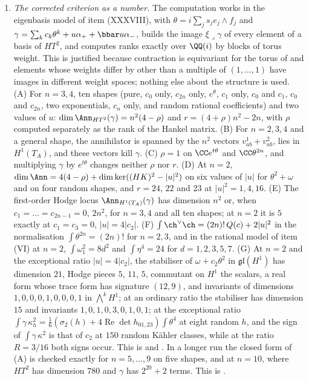\begin{enumerate}[label=\textup{(\Roman*)},leftmargin=*]
\item \emph{The corrected criterion as a number.} The computation works in
  the eigenbasis model of item (XXXVIII), with
  $\theta=i\sum_{j}s_{j}e_{j}\wedge f_{j}$ and
  $\gamma=\sum_{k}c_{k}\theta^{k}+u\alpha_{+}+\bbar u\alpha_{-}$, builds the
  image $\xi\lrcorner\gamma$ of every element of a basis of $HT^{2}$, and
  computes ranks exactly over $\QQ(i)$ by blocks of torus weight. This is
  justified because contraction is equivariant for the torus of
   and elements whose weights differ by other than a
  multiple of $(1,\dots,1)$ have images in different weight spaces; nothing
  else about the structure is used. (A) For $n=3,4$, ten shapes (pure, $c_{0}$
  only, $c_{2n}$ only, $e^{\theta}$, $c_{1}$ only, $c_{0}$ and $c_{1}$, $c_{0}$
  and $c_{2n}$, two exponentials, $c_{n}$ only, and random rational
  coefficients) and two values of $u$: $\dim\Ann_{HT^{2}}(\gamma)=n^{2}(4-\rho)$
  and $r=(4+\rho)n^{2}-2n$, with $\rho$ computed separately as the rank of the
  Hankel matrix. (B) For $n=2,3,4$ and a general shape, the annihilator is
  spanned by the $n^{2}$ vectors $v^{1}_{ab}+v^{2}_{ab}$, lies in $H^{1}(T_{A})$,
  and these vectors kill $\gamma$. (C) $\rho=1$ on $\CC e^{t\theta}$ and
  $\CC\theta^{2n}$, and multiplying $\gamma$ by $e^{t\theta}$ changes neither
  $\rho$ nor $r$. (D) At $n=2$, $\dim\Ann=4(4-\rho)+\dim\ker((HK)^{2}-|u|^{2})$
  on six values of $|u|$ for $\theta^{2}+\omega$ and on four random shapes, and
  $r=24$, $22$ and $23$ at $|u|^{2}=1,4,16$. (E) The first-order Hodge locus
  $\Ann_{H^{1}(T_{A})}(\gamma)$ has dimension $n^{2}$ or, when
  $c_{1}=\dots=c_{2n-1}=0$, $2n^{2}$, for $n=3,4$ and all ten shapes; at $n=2$
  it is $5$ exactly at $c_{1}=c_{3}=0$, $|u|=4|c_{2}|$. (F)
  $\int\ch^{\vee}\ch=(2n)!\,Q(c)+2|u|^{2}$ in the normalisation
  $\int\theta^{2n}=(2n)!$ for $n=2,3$, and in the rational model of item (VI)
  at $n=2$, $\int\omega_{1}^{2}=8d^{2}$ and
  $\int\eta^{4}=24$ for $d=1,2,3,5,7$. (G) At $n=2$ and the exceptional
  ratio $|u|=4|c_{2}|$, the stabiliser of $\omega+c_{2}\theta^{2}$ in
  $\mathfrak{gl}(H^{1})$ has dimension $21$, Hodge pieces $5$, $11$, $5$,
  commutant on $H^{1}$ the scalars, a real form whose trace form has
  signature $(12,9)$, and invariants of dimensions $1,0,0,0,1,0,0,0,1$ in
  $\bigwedge^{k}H^{1}$; at an ordinary ratio the stabiliser has dimension $15$
  and invariants $1,0,1,0,3,0,1,0,1$; at the exceptional ratio
  $\int\gamma\,\kappa_{h}^{2}=\frac16(\sigma_{2}(h)+4\operatorname{Re}\det
  h_{01,23})\int\theta^{4}$ at eight random $h$, and the sign of
  $\int\gamma\,\kappa^{2}$ is that of $c_{2}$ at $150$ random K\"ahler
  classes, while at the ratio $R=3/16$ both signs occur. This is
   and . In a longer
  run the closed form of (A) is checked exactly for $n=5,\dots,9$ on five
  shapes, and at $n=10$, where $HT^{2}$ has dimension $780$ and $\gamma$ has
  $2^{20}+2$ terms. This is .


\end{enumerate}

